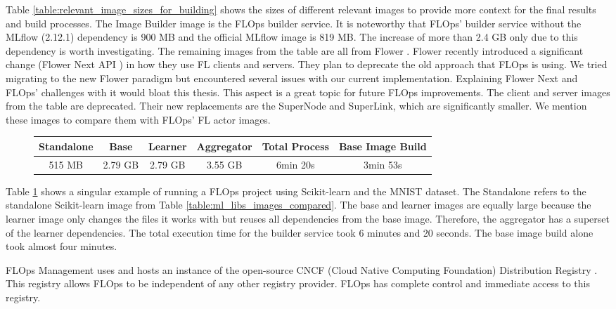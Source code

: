 Table \ref{table:relevant_image_sizes_for_building} shows the sizes of different relevant images to provide more context for the final results and build processes.
The Image Builder image is the FLOps builder service.
It is noteworthy that FLOps' builder service without the MLflow (2.12.1) dependency is 900 MB and the official MLflow image is 819 MB.
The increase of more than 2.4 GB only due to this dependency is worth investigating.
The remaining images from the table are all from Flower \cite{flower_images}.
Flower recently introduced a significant change (Flower Next API \cite{docs:flower_next}) in how they use FL clients and servers.
They plan to deprecate the old approach that FLOps is using.
We tried migrating to the new Flower paradigm but encountered several issues with our current implementation.
Explaining Flower Next and FLOps' challenges with it would bloat this thesis.
This aspect is a great topic for future FLOps improvements.
The client and server images from the table are deprecated.
Their new replacements are the SuperNode and SuperLink, which are significantly smaller.
We mention these images to compare them with FLOps' FL actor images.

\begin{figure}[t]
    \begin{changemargin}{0cm}{0cm}
        \centering
        \begin{tabular}{|c|c|c|c|c|c|}
            \hline
                \textbf{Standalone} & \textbf{Base} & \textbf{Learner} & \textbf{Aggregator} & \textbf{Total Process} & \textbf{Base Image Build} \\
            \hline
                515 MB & 2.79 GB & 2.79 GB & 3.55 GB & 6min 20s & 3min 53s
            \\
            \hline
        \end{tabular}
        \label{table:sklearn_mnist_build_example}
    \end{changemargin}
\end{figure}
Table \ref{table:sklearn_mnist_build_example} shows a singular example of running a FLOps project using Scikit-learn and the MNIST dataset.
The Standalone refers to the standalone Scikit-learn image from Table \ref{table:ml_libs_images_compared}.
The base and learner images are equally large because the learner image only changes the files it works with but reuses all dependencies from the base image.
Therefore, the aggregator has a superset of the learner dependencies.
The total execution time for the builder service took 6 minutes and 20 seconds.
The base image build alone took almost four minutes.

FLOps Management uses and hosts an instance of the open-source CNCF (Cloud Native Computing Foundation) Distribution Registry \cite{docs:cncf_distribution_registry}.
This registry allows FLOps to be independent of any other registry provider.
FLOps has complete control and immediate access to this registry.
